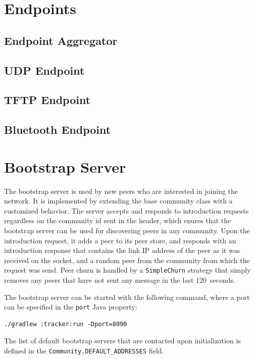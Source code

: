 \section{Endpoints}

\subsection{Endpoint Aggregator}

\subsection{UDP Endpoint}

\subsection{TFTP Endpoint}

\subsection{Bluetooth Endpoint}

\section{Bootstrap Server}

The bootstrap server is used by new peers who are interested in joining the network. It is implemented by extending the base community class with a customized behavior. The server accepts and responds to introduction requests regardless on the community id sent in the header, which enures that the bootstrap server can be used for discovering peers in any community. Upon the introduction request, it adds a peer to its peer store, and responds with an introduction response that contains the link IP address of the peer as it was received on the socket, and a random peer from the community from which the request was send. Peer churn is handled by a \texttt{SimpleChurn} strategy that simply removes any peers that have not sent any message in the last 120~seconds.

The bootstrap server can be started with the following command, where a port can be specified in the \texttt{port} Java property:

\begin{verbatim}
./gradlew :tracker:run -Dport=8090
\end{verbatim}

The list of default bootstrap servers that are contacted upon initialization is defined in the \texttt{Community.DEFAULT\_ADDRESSES} field.

